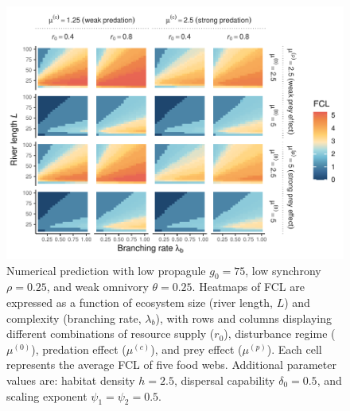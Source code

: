 \begin{figure}
\centering
\includegraphics{../data_fmt/fig_rho025_g75_theta025.pdf}
\caption{Numerical prediction with low propagule \(g_0 = 75\), low
synchrony \(\rho = 0.25\), and weak omnivory \(\theta = 0.25\). Heatmaps
of FCL are expressed as a function of ecosystem size (river length,
\(L\)) and complexity (branching rate, \(\lambda_b\)), with rows and
columns displaying different combinations of resource supply (\(r_0\)),
disturbance regime (\(\mu^{(0)}\)), predation effect (\(\mu^{(c)}\)),
and prey effect (\(\mu^{(p)}\)). Each cell represents the average FCL of
five food webs. Additional parameter values are: habitat density
\(h=2.5\), dispersal capability \(\delta_0=0.5\), and scaling exponent
\(\psi_1=\psi_2=0.5\).}
\end{figure}

\newpage

